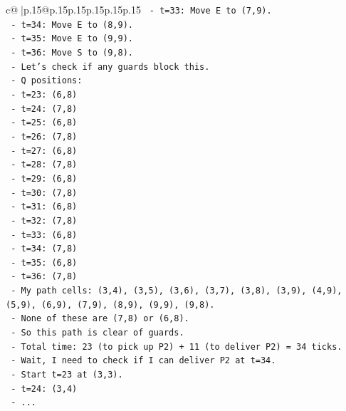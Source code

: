 \documentclass{article}
\begin{document}
{\begin{supertabular}{c@{$\;$}|p{.15\linewidth}@{}p{.15\linewidth}p{.15\linewidth}p{.15\linewidth}p{.15\linewidth}p{.15\linewidth}}
{{{\texttt{                {-}   t=33: Move E to (7,9).} \\
\texttt{                {-}   t=34: Move E to (8,9).} \\
\texttt{                {-}   t=35: Move E to (9,9).} \\
\texttt{                {-}   t=36: Move S to (9,8).} \\
\texttt{            {-}   Let's check if any guards block this.} \\
\texttt{            {-}   Q positions:} \\
\texttt{                {-}   t=23: (6,8)} \\
\texttt{                {-}   t=24: (7,8)} \\
\texttt{                {-}   t=25: (6,8)} \\
\texttt{                {-}   t=26: (7,8)} \\
\texttt{                {-}   t=27: (6,8)} \\
\texttt{                {-}   t=28: (7,8)} \\
\texttt{                {-}   t=29: (6,8)} \\
\texttt{                {-}   t=30: (7,8)} \\
\texttt{                {-}   t=31: (6,8)} \\
\texttt{                {-}   t=32: (7,8)} \\
\texttt{                {-}   t=33: (6,8)} \\
\texttt{                {-}   t=34: (7,8)} \\
\texttt{                {-}   t=35: (6,8)} \\
\texttt{                {-}   t=36: (7,8)} \\
\texttt{            {-}   My path cells: (3,4), (3,5), (3,6), (3,7), (3,8), (3,9), (4,9), (5,9), (6,9), (7,9), (8,9), (9,9), (9,8).} \\
\texttt{            {-}   None of these are (7,8) or (6,8).} \\
\texttt{            {-}   So this path is clear of guards.} \\
\texttt{            {-}   Total time: 23 (to pick up P2) + 11 (to deliver P2) = 34 ticks.} \\
\texttt{            {-}   Wait, I need to check if I can deliver P2 at t=34.} \\
\texttt{            {-}   Start t=23 at (3,3).} \\
\texttt{            {-}   t=24: (3,4)} \\
\texttt{            {-}   ...} \\
}}}
\end{supertabular}}
\end{document}
